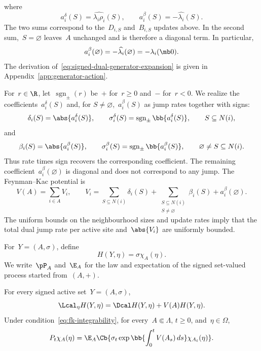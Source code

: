 where
\begin{equation}
\label{eq:signed-dual-coefficients}
a_i^\delta(S)=\widehat{\lambda_i\rho_i}(S),
\qquad
a_i^\beta(S)=-\widehat{\lambda_i}(S).
\end{equation}
The two sums correspond to the~$D_{i,S}$ and~$B_{i,S}$ updates above. In the
second sum,~$S=\varnothing$ leaves~$A$ unchanged and is therefore a diagonal
term. In particular,
\begin{equation*}
a_i^\beta(\varnothing)
=
-\widehat{\lambda_i}(\varnothing)
=
-\lambda_i(\mb 0).
\end{equation*}
The derivation of~\eqref{eq:signed-dual-generator-expansion} is given in
Appendix~\ref{app:generator-action}.

For~$r\in\R$, let~$\operatorname{sgn}_{\pm}(r)$ be~$+$ for~$r\geq0$ and~$-$
for~$r<0$. We realize the coefficients~$a_i^\delta(S)$ and, for
$S\neq\varnothing$,~$a_i^\beta(S)$ as jump rates together with signs:
\begin{equation}
\label{eq:death-split-data}
\delta_i(S)=\abs{a_i^\delta(S)},
\qquad
\sigma_i^\delta(S)=\operatorname{sgn}_{\pm}\bb{a_i^\delta(S)},
\qquad S\subseteq N(i),
\end{equation}
and
\begin{equation}
\label{eq:birth-data}
\beta_i(S)=\abs{a_i^\beta(S)},
\qquad
\sigma_i^\beta(S)=\operatorname{sgn}_{\pm}\bb{a_i^\beta(S)},
\qquad \varnothing\neq S\subseteq N(i).
\end{equation}
Thus rate times sign recovers the corresponding coefficient. The remaining
coefficient~$a_i^\beta(\varnothing)$ is diagonal and does not correspond to any
jump. The Feynman--Kac potential is
\begin{equation}
\label{eq:dual-potential}
V(A)=\sum_{i\in A}V_i,
\qquad
V_i=
\sum_{S\subseteq N(i)}\delta_i(S)
+
\sum_{\substack{S\subseteq N(i)\\S\neq\varnothing}}\beta_i(S)
+
a_i^\beta(\varnothing).
\end{equation}
The uniform bounds on the neighbourhood sizes and update rates imply that the
total dual jump rate per active site and~$\abs{V_i}$ are uniformly bounded.

For~$Y=(A,\sigma)$, define
\begin{equation}
\label{eq:monomial-duality-function}
H(Y,\eta)=\sigma\chi_A(\eta).
\end{equation}
We write~$\pP_A$ and~$\E_A$ for the law and expectation of the signed set-valued
process started from~$(A,+)$.

\begin{theorem}
\label{thm:monomial-duality}
For every signed active set~$Y=(A,\sigma)$,
\begin{equation}
\label{eq:monomial-generator-duality}
\Lcal_\eta H(Y,\eta)
=
\Dcal H(Y,\eta)+V(A)H(Y,\eta).
\end{equation}
Under condition~\eqref{eq:fk-integrability}, for every~$A\Subset\Lambda$,
$t\geq0$, and~$\eta\in\Omega$,
\begin{equation}
\label{eq:monomial-feynman-kac-duality}
P_t\chi_A(\eta)
=
\E_A\Cb{
\sigma_t
\exp\bb{\int_0^t V(A_s)\,ds}
\chi_{A_t}(\eta)
}.
\end{equation}
\end{theorem}

